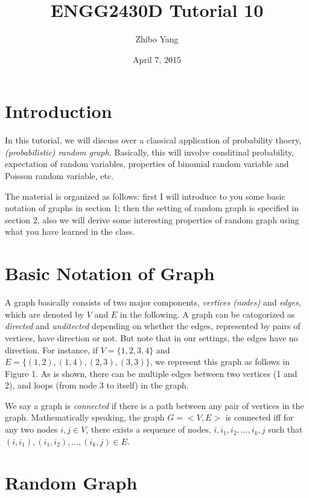 \documentclass{IEEEconf}
\newcommand{\nocomma}{}
\newcommand{\tmtextit}[1]{{\itshape{#1}}}
\begin{document}
\title{ENGG2430D Tutorial 10}

\author{Zhibo Yang}

\date{April 7, 2015}

\maketitle

\section{Introduction}

In this tutorial, we will discuss over a classical application of probability
thoery, \tmtextit{(probabilistic) random graph}. Basically, this will involve
conditinal probability, expectation of random variables, properties of
binomial random variable and Poisson random variable, etc.

The material is organized as follows: first I will introduce to you some basic
notation of graphs in section 1; then the setting of random graph is specified
in section 2, also we will derive some interesting properties of random graph
using what you have learned in the class.

\section{Basic Notation of Graph}

A graph basically consists of two major components, \tmtextit{vertices
(nodes)} and \tmtextit{edges}, which are denoted by $V$ and $E$ in the
following. A graph can be catogorized as \tmtextit{directed} and
\tmtextit{unditected} depending on whether the edges, represented by pairs of
vertices, have direction or not. But note that in our settings, the edges have
no direction. For instance, if $V = \{ 1, 2 \nocomma, 3, 4 \}$ and $E = \{ (1,
2), (1, 4), (2, 3), (3, 3) \}$, we represent this graph as follows in Figure
1. As is shown, there can be multiple edges between two vertices (1 and 2),
and loops (from node 3 to itself) in the graph.

We say a graph is \tmtextit{connected} if there is a path between any pair of
vertices in the graph. Mathematically speaking, the graph $G = < V, E >$ is
connected iff for any two nodes $i, j \in V$, there exists a sequence of
nodes, $i, i_1, i_2, \ldots, i_k, j$ such that $(i, i_1), (i_1, i_2), \ldots,
(i_k, j) \in E$.

\section{Random Graph}
\end{document}
